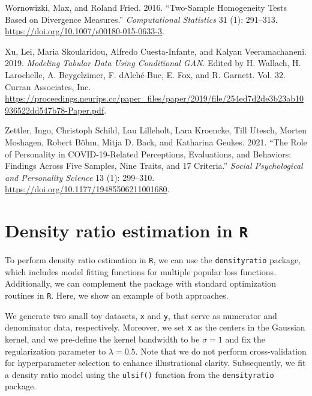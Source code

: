\documentclass[
]{article}
\newlength{\cslhangindent}
\newenvironment{CSLReferences}[2] %
 {\begin{list}{}{%
  \setlength{\itemindent}{0pt}
  \setlength{\leftmargin}{0pt}
  \setlength{\parsep}{0pt}
  \ifodd #1
   \setlength{\leftmargin}{\cslhangindent}
   \setlength{\itemindent}{-1\cslhangindent}
  \fi
  \setlength{\itemsep}{#2\baselineskip}}}
 {\end{list}}
\begin{document}
\begin{CSLReferences}{1}{0}
Wornowizki, Max, and Roland Fried. 2016. {``Two-Sample Homogeneity Tests
Based on Divergence Measures.''} \emph{Computational Statistics} 31 (1):
291--313. \url{https://doi.org/10.1007/s00180-015-0633-3}.

Xu, Lei, Maria Skoularidou, Alfredo Cuesta-Infante, and Kalyan
Veeramachaneni. 2019. \emph{Modeling Tabular Data Using Conditional
GAN}. Edited by H. Wallach, H. Larochelle, A. Beygelzimer, F.
dAlché-Buc, E. Fox, and R. Garnett. Vol. 32. Curran Associates, Inc.
\url{https://proceedings.neurips.cc/paper_files/paper/2019/file/254ed7d2de3b23ab10936522dd547b78-Paper.pdf}.

Zettler, Ingo, Christoph Schild, Lau Lilleholt, Lara Kroencke, Till
Utesch, Morten Moshagen, Robert Böhm, Mitja D. Back, and Katharina
Geukes. 2021. {``The Role of Personality in COVID-19-Related
Perceptions, Evaluations, and Behaviors: Findings Across Five Samples,
Nine Traits, and 17 Criteria.''} \emph{Social Psychological and
Personality Science} 13 (1): 299--310.
\url{https://doi.org/10.1177/19485506211001680}.

\end{CSLReferences}

\setcounter{section}{0}
\renewcommand{\thesection}{\Alph{section}}

\setcounter{table}{0}
\renewcommand{\thetable}{A\arabic{table}}

\setcounter{figure}{0}
\renewcommand{\thefigure}{A\arabic{figure}}

\section{\texorpdfstring{Density ratio estimation in
\texttt{R}}{Density ratio estimation in R}}\label{sec-app-A}

To perform density ratio estimation in \texttt{R}, we can use the
\texttt{densityratio} package, which includes model fitting functions
for multiple popular loss functions. Additionally, we can complement the
package with standard optimization routines in \texttt{R}. Here, we show
an example of both approaches.

We generate two small toy datasets, \texttt{x} and \texttt{y}, that
serve as numerator and denominator data, respectively. Moreover, we set
\texttt{x} as the centers in the Gaussian kernel, and we pre-define the
kernel bandwidth to be \(\sigma = 1\) and fix the regularization
parameter to \(\lambda = 0.5\). Note that we do not perform
cross-validation for hyperparameter selection to enhance illustrational
clarity. Subsequently, we fit a density ratio model using the
\texttt{ulsif()} function from the \texttt{densityratio} package.
\end{document}
